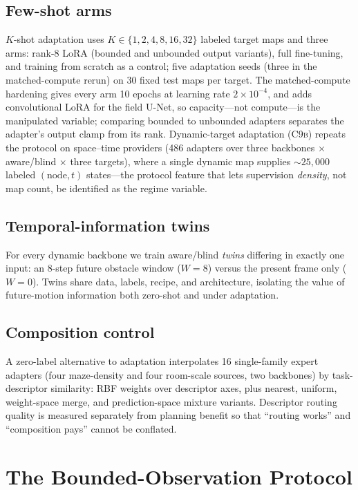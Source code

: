 \documentclass[11pt,letterpaper]{article}
\newcommand{\stage}[1]{\textsc{#1}}
\begin{document}
\subsection{Few-shot arms}
$K$-shot adaptation uses $K \in \{1,2,4,8,16,32\}$ labeled target maps and three arms: rank-8 LoRA \citep{hu2021lora} (bounded and unbounded output variants), full fine-tuning, and training from scratch as a control; five adaptation seeds (three in the matched-compute rerun) on 30 fixed test maps per target. The matched-compute hardening gives every arm 10 epochs at learning rate $2{\times}10^{-4}$, and adds convolutional LoRA for the field U-Net, so capacity---not compute---is the manipulated variable; comparing bounded to unbounded adapters separates the adapter's output clamp from its rank. Dynamic-target adaptation (\stage{C9b}) repeats the protocol on space--time providers (486 adapters over three backbones $\times$ aware/blind $\times$ three targets), where a single dynamic map supplies ${\sim}25{,}000$ labeled $(\text{node},t)$ states---the protocol feature that lets supervision \emph{density}, not map count, be identified as the regime variable.

\subsection{Temporal-information twins}
For every dynamic backbone we train aware/blind \emph{twins} differing in exactly one input: an 8-step future obstacle window ($W{=}8$) versus the present frame only ($W{=}0$). Twins share data, labels, recipe, and architecture, isolating the value of future-motion information both zero-shot and under adaptation.

\subsection{Composition control}
A zero-label alternative to adaptation interpolates 16 single-family expert adapters (four maze-density and four room-scale sources, two backbones) by task-descriptor similarity: RBF weights over descriptor axes, plus nearest, uniform, weight-space merge, and prediction-space mixture variants. Descriptor routing quality is measured separately from planning benefit so that ``routing works'' and ``composition pays'' cannot be conflated.

\section{The Bounded-Observation Protocol}
\end{document}
